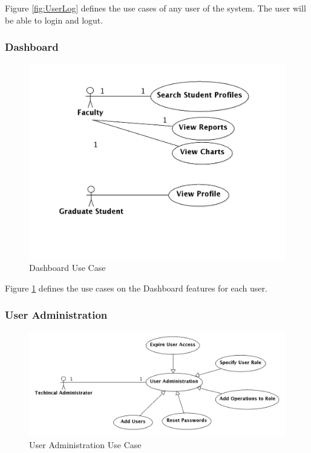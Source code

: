\documentclass{journal}
\begin{document}
Figure \ref{fig:UserLog} defines the use cases of any user of the system. The user will be able to login and logut.

\subsubsection{Dashboard}

\begin{figure}[htp]
\centering
\includegraphics[scale=0.25]{diagrams/use_cases/Dashboard_uc.png}
\caption{Dashboard Use Case}
\label{fig:Dashboard}
\end{figure}

Figure \ref{fig:Dashboard} defines the use cases on the Dashboard features for each user.

\subsubsection{User Administration}

\begin{figure}[htp]
\centering
\includegraphics[scale=0.25]{diagrams/use_cases/TechAdmin_uc.png}
\caption{User Administration Use Case}
\label{fig:UserAdmin}
\end{figure}
\end{document}
